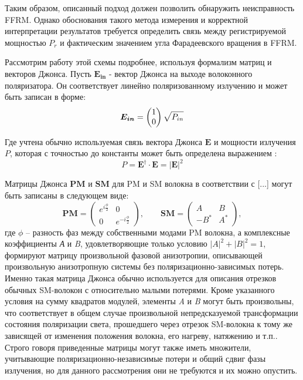 \documentclass{article}
\begin{document}
Таким образом, описанный подход должен позволить обнаружить неисправность FFRM.
Однако обоснования такого метода измерения и корректной интерпретации результатов требуется определить связь между регистрируемой мощностью $P_{r}$ и фактическим значением угла Фарадеевского вращения в FFRM.

Рассмотрим работу этой схемы  подробнее, используя формализм матриц и векторов Джонса.
Пусть $\bm{E_{in}}$ - вектор Джонса на выходе волоконного поляризатора.
Он соответствует линейно поляризованному излучению и может быть записан в форме:
\begin{equation}
	\label{eq:Ein}
	\bm{E_{in}} = \begin{pmatrix} 1 \\ 0 \end{pmatrix}\sqrt{P_{in}} \\
\end{equation}

Где учтена обычно используемая связь вектора Джонса $\bm{E}$ и мощности излучения $P$, которая с точностью до константы может быть определена выражением \autocite{azzamEllipsometryPolarizedLight1977}: 	
\begin{equation}
	\label{eq:P-E}
	P = \bm{E^\dagger} \cdot \bm{E} = \left|\bm{E} \right|^2 
\end{equation}

Матрицы Джонса $\bm{PM}$ и $\bm{SM}$ для PM и SM волокна в соответствии с [...] могут быть записаны в следующем виде:
\begin{equation}
\label{eq:PM-SM}
    \bm{PM} = 
    \begin{pmatrix}
    e^{i\frac{\phi}{2}} & 0 \\
    0 & e^{-i\frac{\phi}{2}}
    \end{pmatrix},
    \qquad 
    \bm{SM} = 
    \begin{pmatrix}
    A & B \\
    -B^* & A^*
    \end{pmatrix},
\end{equation}
где $\phi$ – разность фаз между собственными модами PM волокна, а комплексные коэффициенты \textit{А} и \textit{B}, удовлетворяющие только условию $|A|^2 + |B|^2 = 1$, формируют матрицу произвольной фазовой анизотропии, описывающей произвольную анизотропную системы без поляризационно-зависимых потерь.
Именно такая матрица Джонса обычно используется для описания отрезков обычных SM-волокон с относительно малыми потерями.
Кроме указанного условия на сумму квадратов модулей, элементы \textit{A} и \textit{B} могут быть произвольны, что соответствует в общем случае произвольной непредсказуемой трансформации состояния поляризации света, прошедшего через отрезок SM-волокна к тому же зависящей от изменения положения волокна, его нагреву, натяжению и т.п..
Строго говоря приведенные матрицы могут также иметь множители, учитывающие поляризационно-независимые потери и общий сдвиг фазы излучения, но для данного рассмотрения они не требуются и их можно опустить.
\end{document}
